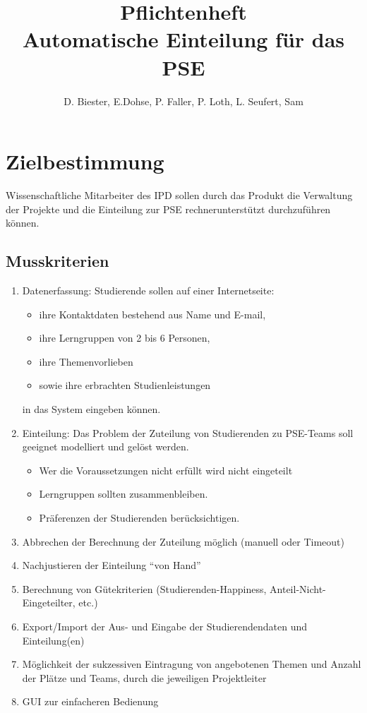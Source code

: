 \documentclass[parskip=full]{scrartcl}
\newcommand{\swtLabel}[1]{\textbf{\textbackslash #1\arabic*0\textbackslash}}
\begin{document}
\title{Pflichtenheft \\
        \large Automatische Einteilung für das PSE}

\author{D. Biester, E.Dohse, P. Faller, P. Loth, L. Seufert, Sam}
        
\maketitle
 

\tableofcontents
 

\section{Zielbestimmung}
Wissenschaftliche Mitarbeiter des IPD sollen durch das Produkt die Verwaltung
der Projekte und die Einteilung zur PSE rechnerunterstützt durchzuführen können.


\subsection{Musskriterien}
 \begin{enumerate}[label=\swtLabel{M}]
   \item Datenerfassung: Studierende sollen auf einer Internetseite:   
   \begin{itemize}
     \item ihre Kontaktdaten bestehend aus Name und E-mail,
     \item ihre Lerngruppen von 2 bis 6 Personen,
     \item ihre Themenvorlieben 
     \item sowie ihre erbrachten Studienleistungen 
   \end{itemize}
   in das System eingeben können.
   \item Einteilung: Das Problem der Zuteilung von Studierenden zu PSE-Teams
   soll geeignet modelliert und gelöst werden. 
   \begin{itemize}
     \item Wer die Voraussetzungen nicht erfüllt wird nicht eingeteilt
     \item Lerngruppen sollten zusammenbleiben.
     \item Präferenzen der Studierenden berücksichtigen.
   \end{itemize}
   \item Abbrechen der Berechnung der Zuteilung möglich (manuell oder Timeout)
   \item Nachjustieren der Einteilung “von Hand”
   \item Berechnung von Gütekriterien (Studierenden-Happiness,
   Anteil-Nicht-Eingeteilter, etc.)
   \item Export/Import der Aus- und Eingabe der Studierendendaten und
   Einteilung(en)
   \item Möglichkeit der sukzessiven Eintragung von angebotenen Themen und
   Anzahl der Plätze und Teams, durch die jeweiligen Projektleiter
   \item GUI zur einfacheren Bedienung    
 \end{enumerate}
\end{document}

